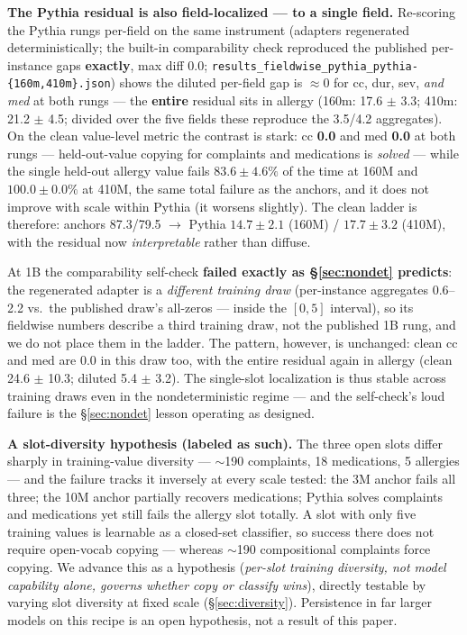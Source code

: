 \documentclass[11pt]{article}
\begin{document}
\textbf{The Pythia residual is also field-localized --- to a single field.} Re-scoring the Pythia rungs per-field on the same instrument (adapters regenerated deterministically; the built-in comparability check reproduced the published per-instance gaps \textbf{exactly}, max diff 0.0; \texttt{results\_fieldwise\_pythia\_pythia-\{160m,410m\}.json}) shows the diluted per-field gap is $\approx$0 for cc, dur, sev, \emph{and med} at both rungs --- the \textbf{entire} residual sits in allergy (160m: 17.6 $\pm$ 3.3; 410m: 21.2 $\pm$ 4.5; divided over the five fields these reproduce the 3.5/4.2 aggregates). On the clean value-level metric the contrast is stark: cc \textbf{0.0} and med \textbf{0.0} at both rungs --- held-out-value copying for complaints and medications is \emph{solved} --- while the single held-out allergy value fails $\mathbf{83.6}\pm\mathbf{4.6}\%$ of the time at 160M and $\mathbf{100.0}\pm\mathbf{0.0}\%$ at 410M, the same total failure as the anchors, and it does not improve with scale within Pythia (it worsens slightly). The clean ladder is therefore: anchors 87.3/79.5 $\rightarrow$ Pythia $\mathbf{14.7}\pm\mathbf{2.1}$ (160M) / $\mathbf{17.7}\pm\mathbf{3.2}$ (410M), with the residual now \emph{interpretable} rather than diffuse.

At 1B the comparability self-check \textbf{failed exactly as \S\ref{sec:nondet} predicts}: the regenerated adapter is a \emph{different training draw} (per-instance aggregates 0.6--2.2 vs.~the published draw's all-zeros --- inside the $[0,5]$ interval), so its fieldwise numbers describe a third training draw, not the published 1B rung, and we do not place them in the ladder. The pattern, however, is unchanged: clean cc and med are 0.0 in this draw too, with the entire residual again in allergy (clean 24.6 $\pm$ 10.3; diluted 5.4 $\pm$ 3.2). The single-slot localization is thus stable across training draws even in the nondeterministic regime --- and the self-check's loud failure is the \S\ref{sec:nondet} lesson operating as designed.

\textbf{A slot-diversity hypothesis (labeled as such).} The three open slots differ sharply in training-value diversity --- $\sim$190 complaints, 18 medications, 5 allergies --- and the failure tracks it inversely at every scale tested: the 3M anchor fails all three; the 10M anchor partially recovers medications; Pythia solves complaints and medications yet still fails the allergy slot totally. A slot with only five training values is learnable as a closed-set classifier, so success there does not require open-vocab copying --- whereas $\sim$190 compositional complaints force copying. We advance this as a hypothesis (\emph{per-slot training diversity, not model capability alone, governs whether copy or classify wins}), directly testable by varying slot diversity at fixed scale (\S\ref{sec:diversity}). Persistence in far larger models on this recipe is an open hypothesis, not a result of this paper.
\end{document}
